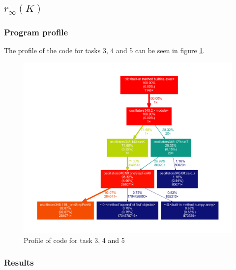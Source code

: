 \documentclass[11pt,a4paper]{article}
\begin{document}
\subsection{$r_{\infty}(K)$}


\subsubsection{Program profile}
The profile of the code for tasks 3, 4 and 5 can be seen in figure \ref{profile345}.
\begin{figure}[h]
	\centering
	\includegraphics[width=\textwidth]{graphics/profile345.pdf} %
	\caption{Profile of code for task 3, 4 and 5}
	\label{profile345}
\end{figure}


\subsubsection{Results}
\end{document}
